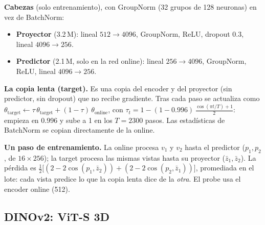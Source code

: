 \documentclass[11pt,a4paper]{article}
\begin{document}
\textbf{Cabezas} (solo entrenamiento), con GroupNorm (32 grupos de 128 neuronas) en vez de BatchNorm:
\begin{itemize}
\item \textbf{Proyector} (3.2\,M): lineal $512\rightarrow4096$, GroupNorm, ReLU, dropout 0.3, lineal
  $4096\rightarrow256$.
\item \textbf{Predictor} (2.1\,M, solo en la red online): lineal $256\rightarrow4096$, GroupNorm,
  ReLU, lineal $4096\rightarrow256$.
\end{itemize}

\textbf{La copia lenta (target).} Es una copia del encoder y del proyector (sin predictor, sin
dropout) que no recibe gradiente. Tras cada paso se actualiza como
$\theta_\text{target}\leftarrow\tau\,\theta_\text{target}+(1-\tau)\,\theta_\text{online}$, con
$\tau_t = 1-(1-0.996)\,\frac{\cos(\pi t/T)+1}{2}$: empieza en 0.996 y sube a 1 en los $T=2300$ pasos.
Las estadísticas de BatchNorm se copian directamente de la online.

\textbf{Un paso de entrenamiento.} La online procesa $v_1$ y $v_2$ hasta el predictor ($p_1,p_2$, de
$16\times256$); la target procesa las mismas vistas hasta su proyector ($\bar z_1,\bar z_2$). La
pérdida es $\tfrac12\big[(2-2\cos(p_1,\bar z_2))+(2-2\cos(p_2,\bar z_1))\big]$, promediada en el lote:
cada vista predice lo que la copia lenta dice de la \emph{otra}. El probe usa el encoder online (512).

\subsection{DINOv2: ViT-S 3D}
\label{sec:vit}
\end{document}
